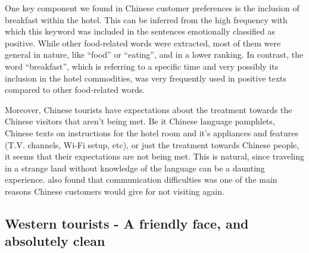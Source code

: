 One key component we found in Chinese customer preferences is the inclusion of breakfast within the hotel. This can be inferred from the high frequency with which this keyword was included in the sentences emotionally classified as positive. While other food-related words were extracted, most of them were general in nature, like “food” or “eating”, and in a lower ranking. In contrast, the word “breakfast”, which is referring to a specific time and very possibly its inclusion in the hotel commodities, was very frequently used in positive texts compared to other food-related words. 

Moreover, Chinese tourists have expectations about the treatment towards the Chinese visitors that aren't being met. Be it Chinese language pamphlets, Chinese texts on instructions for the hotel room and it's appliances and features (T.V. channels, Wi-Fi setup, etc), or just the treatment towards Chinese people, it seems that their expectations are not being met. This is natural, since traveling in a strange land without knowledge of the language can be a daunting experience. \cite{ryan2001} also found that communication difficulties was one of the main reasons Chinese customers would give for not visiting again. 

\subsection{Western tourists - A friendly face, and absolutely clean}\label{disc:en}

